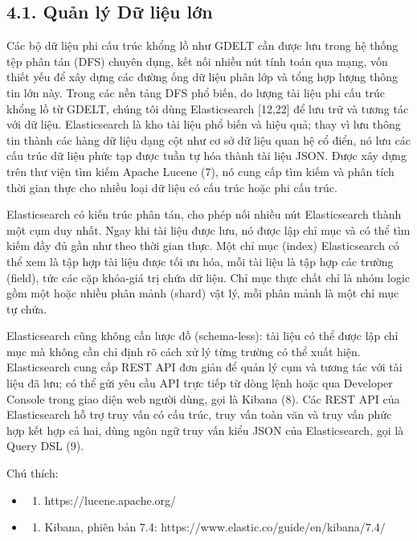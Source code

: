 \subsection{4.1. Quản lý Dữ liệu lớn}

Các bộ dữ liệu phi cấu trúc khổng lồ như GDELT cần được lưu trong hệ thống tệp phân tán (DFS) chuyên dụng, kết nối nhiều nút tính toán qua mạng, vốn thiết yếu để xây dựng các đường ống dữ liệu phân lớp và tổng hợp lượng thông tin lớn này. Trong các nền tảng DFS phổ biến, do lượng tài liệu phi cấu trúc khổng lồ từ GDELT, chúng tôi dùng Elasticsearch {[}12,22{]} để lưu trữ và tương tác với dữ liệu. Elasticsearch là kho tài liệu phổ biến và hiệu quả; thay vì lưu thông tin thành các hàng dữ liệu dạng cột như cơ sở dữ liệu quan hệ cổ điển, nó lưu các cấu trúc dữ liệu phức tạp được tuần tự hóa thành tài liệu JSON. Được xây dựng trên thư viện tìm kiếm Apache Lucene (7), nó cung cấp tìm kiếm và phân tích thời gian thực cho nhiều loại dữ liệu có cấu trúc hoặc phi cấu trúc.

Elasticsearch có kiến trúc phân tán, cho phép nối nhiều nút Elasticsearch thành một cụm duy nhất. Ngay khi tài liệu được lưu, nó được lập chỉ mục và có thể tìm kiếm đầy đủ gần như theo thời gian thực. Một chỉ mục (index) Elasticsearch có thể xem là tập hợp tài liệu được tối ưu hóa, mỗi tài liệu là tập hợp các trường (field), tức các cặp khóa-giá trị chứa dữ liệu. Chỉ mục thực chất chỉ là nhóm logic gồm một hoặc nhiều phân mảnh (shard) vật lý, mỗi phân mảnh là một chỉ mục tự chứa.

Elasticsearch cũng không cần lược đồ (schema-less): tài liệu có thể được lập chỉ mục mà không cần chỉ định rõ cách xử lý từng trường có thể xuất hiện. Elasticsearch cung cấp REST API đơn giản để quản lý cụm và tương tác với tài liệu đã lưu; có thể gửi yêu cầu API trực tiếp từ dòng lệnh hoặc qua Developer Console trong giao diện web người dùng, gọi là Kibana (8). Các REST API của Elasticsearch hỗ trợ truy vấn có cấu trúc, truy vấn toàn văn và truy vấn phức hợp kết hợp cả hai, dùng ngôn ngữ truy vấn kiểu JSON của Elasticsearch, gọi là Query DSL (9).

Chú thích:

\begin{itemize}
\item
  \begin{enumerate}
  \def\labelenumi{(\arabic{enumi})}
  \setcounter{enumi}{6}
    \item
    https://lucene.apache.org/
  \end{enumerate}
\item
  \begin{enumerate}
  \def\labelenumi{(\arabic{enumi})}
  \setcounter{enumi}{7}
    \item
    Kibana, phiên bản 7.4: https://www.elastic.co/guide/en/kibana/7.4/
  \end{enumerate}
\end{itemize}

